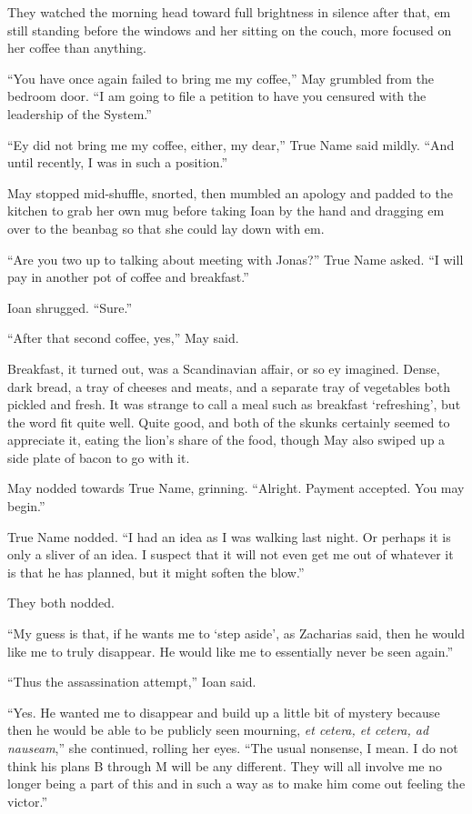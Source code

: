 They watched the morning head toward full brightness in silence after that, em still standing before the windows and her sitting on the couch, more focused on her coffee than anything.

``You have once again failed to bring me my coffee,'' May grumbled from the bedroom door. ``I am going to file a petition to have you censured with the leadership of the System.''

``Ey did not bring me my coffee, either, my dear,'' True Name said mildly. ``And until recently, I was in such a position.''

May stopped mid-shuffle, snorted, then mumbled an apology and padded to the kitchen to grab her own mug before taking Ioan by the hand and dragging em over to the beanbag so that she could lay down with em.

``Are you two up to talking about meeting with Jonas?'' True Name asked. ``I will pay in another pot of coffee and breakfast.''

Ioan shrugged. ``Sure.''

``After that second coffee, yes,'' May said.

Breakfast, it turned out, was a Scandinavian affair, or so ey imagined. Dense, dark bread, a tray of cheeses and meats, and a separate tray of vegetables both pickled and fresh. It was strange to call a meal such as breakfast `refreshing', but the word fit quite well. Quite good, and both of the skunks certainly seemed to appreciate it, eating the lion's share of the food, though May also swiped up a side plate of bacon to go with it.

May nodded towards True Name, grinning. ``Alright. Payment accepted. You may begin.''

True Name nodded. ``I had an idea as I was walking last night. Or perhaps it is only a sliver of an idea. I suspect that it will not even get me out of whatever it is that he has planned, but it might soften the blow.''

They both nodded.

``My guess is that, if he wants me to `step aside', as Zacharias said, then he would like me to truly disappear. He would like me to essentially never be seen again.''

``Thus the assassination attempt,'' Ioan said.

``Yes. He wanted me to disappear and build up a little bit of mystery because then he would be able to be publicly seen mourning, \emph{et cetera, et cetera, ad nauseam},'' she continued, rolling her eyes. ``The usual nonsense, I mean. I do not think his plans B through M will be any different. They will all involve me no longer being a part of this and in such a way as to make him come out feeling the victor.''

